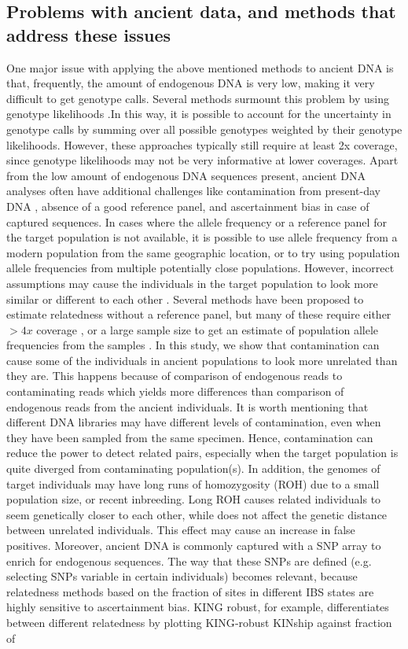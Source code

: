 \documentclass[12pt, letterpaper]{article}
\begin{document}
\subsection{Problems with ancient data, and methods that address these issues}
One major issue with applying the above mentioned methods to ancient DNA is that, frequently, the amount of endogenous DNA is very low, making it very difficult to get genotype calls.
Several methods surmount this problem by using genotype likelihoods \cite{lipatov_maximum_2015,korneliussen_ngsrelate_2015}.In this way, it is possible to account for the uncertainty in genotype calls by summing over all possible genotypes weighted by their genotype likelihoods. However, these approaches typically still require at least 2x coverage, since genotype likelihoods may not be very informative at lower coverages. Apart from the low amount of endogenous DNA sequences present, ancient DNA analyses often have additional challenges like contamination from present-day DNA \cite{peyregne_authentict_2020}, absence of a good reference panel, and ascertainment bias in case of captured sequences. In cases where the allele frequency or a reference panel for the target population is not available, it is possible to use allele frequency from a modern population from the same geographic location, or to try using population allele frequencies from multiple potentially close populations. However, incorrect assumptions may cause the individuals in the target population to look more similar or different to each other \cite{amorim_understanding_2018}. Several methods have been proposed to estimate relatedness without a reference panel, but many of these require either $>4x$ coverage \cite{waples_allele_2019}, or a large sample size to get an estimate of population allele frequencies from the samples \cite{theunert_joint_2017}. In this study, we show that contamination can cause some of the individuals in ancient populations to look more unrelated than they are. This happens because of comparison of endogenous reads to contaminating reads which yields more differences than comparison of endogenous reads from the ancient individuals. It is worth mentioning that different DNA libraries may have different levels of contamination, even when they have been sampled from the same specimen. Hence, contamination can reduce the power to detect related pairs, especially when the target population is quite diverged from contaminating population(s). In addition, the genomes of target individuals may have long runs of homozygosity (ROH) due to a small population size, or recent inbreeding. Long ROH causes related individuals to seem genetically closer to each other, while does not affect the genetic distance between unrelated individuals. This effect may cause an increase in false positives. Moreover, ancient DNA is commonly captured with a SNP array to enrich for endogenous sequences. The way that these SNPs are defined (e.g. selecting SNPs variable in certain individuals) becomes relevant, because relatedness methods based on the fraction of sites in different IBS states are highly sensitive to ascertainment bias. KING robust, for example, differentiates between different relatedness by plotting KING‐robust KINship against fraction of 
\end{document}
